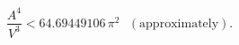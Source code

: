 \begin{equation}
\frac{A^4}{V^3} < 64.69449106\,\pi^2\,\,\,\, (\mathrm{approximately}).
\end{equation}

